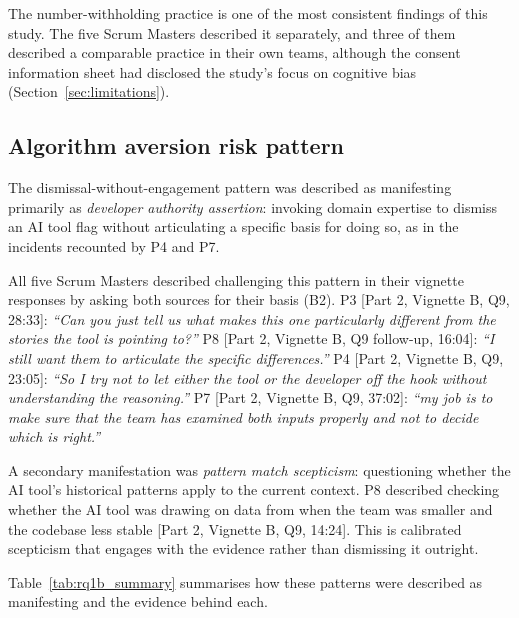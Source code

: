 \documentclass[a4paper,twoside]{bth}
\begin{document}
The number-withholding practice is one of the most consistent findings of this study. The five Scrum Masters described it separately, and three of them described a comparable practice in their own teams, although the consent information sheet had disclosed the study's focus on cognitive bias (Section~\ref{sec:limitations}).

\subsection{Algorithm aversion risk pattern}

The dismissal-without-engagement pattern was described as manifesting primarily as \textit{developer authority assertion}: invoking domain expertise to dismiss an AI tool flag without articulating a specific basis for doing so, as in the incidents recounted by P4 and P7.

All five Scrum Masters described challenging this pattern in their vignette responses by asking both sources for their basis (B2). P3 [Part 2, Vignette B, Q9, 28:33]: \textit{``Can you just tell us what makes this one particularly different from the stories the tool is pointing to?''} P8 [Part 2, Vignette B, Q9 follow-up, 16:04]: \textit{``I still want them to articulate the specific differences.''} P4 [Part 2, Vignette B, Q9, 23:05]: \textit{``So I try not to let either the tool or the developer off the hook without understanding the reasoning.''} P7 [Part 2, Vignette B, Q9, 37:02]: \textit{``my job is to make sure that the team has examined both inputs properly and not to decide which is right.''}

A secondary manifestation was \textit{pattern match scepticism}: questioning whether the AI tool's historical patterns apply to the current context. P8 described checking whether the AI tool was drawing on data from when the team was smaller and the codebase less stable [Part 2, Vignette B, Q9, 14:24]. This is calibrated scepticism that engages with the evidence rather than dismissing it outright.

Table~\ref{tab:rq1b_summary} summarises how these patterns were described as manifesting and the evidence behind each.
\end{document}
